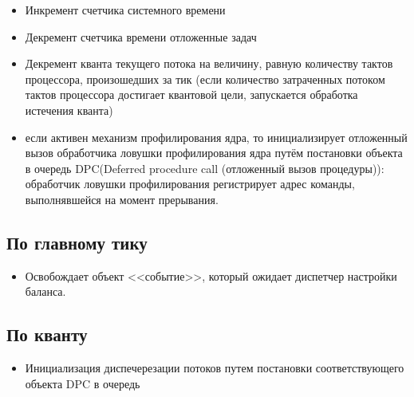             \begin{itemize}
                \item Инкремент счетчика системного времени
                \item Декремент счетчика времени отложенные задач
                \item Декремент кванта текущего потока на величину, равную количеству тактов процессора, произошедших за тик (если количество затраченных потоком тактов процессора достигает квантовой цели, запускается обработка истечения кванта)
                \item если активен механизм профилирования ядра, то инициализирует отложенный вызов обработчика ловушки профилирования ядра путём постановки объекта в очередь DPC(Deferred procedure call (отложенный вызов процедуры)): обработчик ловушки профилирования регистрирует адрес команды, выполнявшейся на момент прерывания.
            \end{itemize}
        
        \subsection{По главному тику}
        
            \begin{itemize}
                \item Освобождает объект <<событие>>, который ожидает диспетчер настройки баланса.
            \end{itemize}
        
        \subsection{По кванту}
    
            \begin{itemize}
                \item Инициализация диспечерезации потоков путем постановки соответствующего объекта DPC в очередь
            \end{itemize}
        